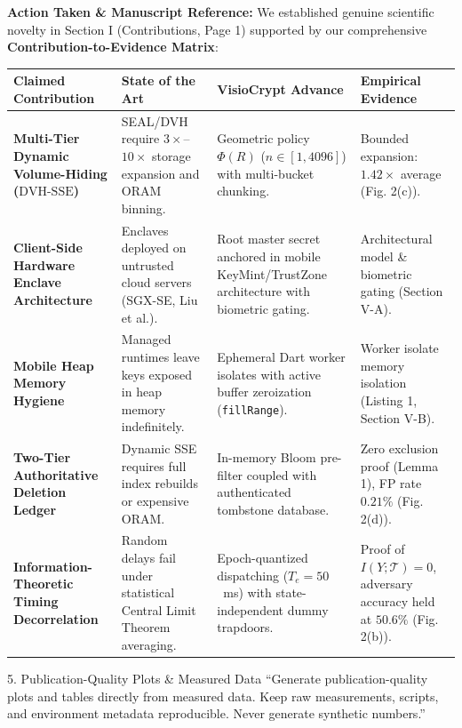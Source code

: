 \documentclass[11pt,a4paper]{article}
\begin{document}
\begin{responsebox}
\textbf{Action Taken \& Manuscript Reference:} We established genuine scientific novelty in Section I (Contributions, Page 1) supported by our comprehensive \textbf{Contribution-to-Evidence Matrix}:

\begin{center}
\footnotesize
\setlength{\tabcolsep}{3pt}
\renewcommand{\arraystretch}{1.1}
\begin{tabular}{p{3.0cm}p{3.6cm}p{4.2cm}p{3.2cm}}
\toprule
\textbf{Claimed Contribution} & \textbf{State of the Art} & \textbf{VisioCrypt Advance} & \textbf{Empirical Evidence} \\
\midrule
\textbf{Multi-Tier Dynamic Volume-Hiding ($\text{DVH-SSE}$)} & SEAL/DVH require $3\times$--$10\times$ storage expansion and ORAM binning. & Geometric policy $\Phi(R)$ ($n \in [1, 4096]$) with multi-bucket chunking. & Bounded expansion: $1.42\times$ average (Fig. 2(c)). \\
\textbf{Client-Side Hardware Enclave Architecture} & Enclaves deployed on untrusted cloud servers (SGX-SE, Liu et al.). & Root master secret anchored in mobile KeyMint/TrustZone architecture with biometric gating. & Architectural model \& biometric gating (Section V-A). \\
\textbf{Mobile Heap Memory Hygiene} & Managed runtimes leave keys exposed in heap memory indefinitely. & Ephemeral Dart worker isolates with active buffer zeroization (\texttt{fillRange}). & Worker isolate memory isolation (Listing 1, Section V-B). \\
\textbf{Two-Tier Authoritative Deletion Ledger} & Dynamic SSE requires full index rebuilds or expensive ORAM. & In-memory Bloom pre-filter coupled with authenticated tombstone database. & Zero exclusion proof (Lemma 1), FP rate $0.21\%$ (Fig. 2(d)). \\
\textbf{Information-Theoretic Timing Decorrelation} & Random delays fail under statistical Central Limit Theorem averaging. & Epoch-quantized dispatching ($T_e = 50$~ms) with state-independent dummy trapdoors. & Proof of $I(Y;\mathcal{T})=0$, adversary accuracy held at $50.6\%$ (Fig. 2(b)). \\
\bottomrule
\end{tabular}
\end{center}
\end{responsebox}

\vspace{1em}

\begin{reviewbox}{5. Publication-Quality Plots \& Measured Data}
``Generate publication-quality plots and tables directly from measured data. Keep raw measurements, scripts, and environment metadata reproducible. Never generate synthetic numbers.''
\end{reviewbox}
\end{document}
